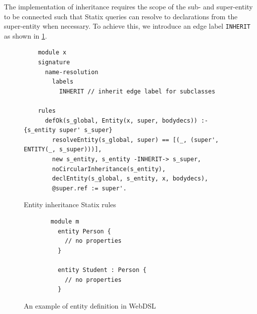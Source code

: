       The implementation of inheritance requires the scope of the sub- and super-entity to be connected such that Statix queries can resolve to declarations from the super-entity when necessary. To achieve this, we introduce an edge label \texttt{INHERIT} as shown in \cref{fig:inheritance-statix-rules}.

      \begin{figure}
        \begin{verbatim}
    module x
    signature
      name-resolution
        labels
          INHERIT // inherit edge label for subclasses
  
    rules
      defOk(s_global, Entity(x, super, bodydecs)) :- {s_entity super' s_super}
        resolveEntity(s_global, super) == [(_, (super', ENTITY(_, s_super)))],
        new s_entity, s_entity -INHERIT-> s_super,
        noCircularInheritance(s_entity),
        declEntity(s_global, s_entity, x, bodydecs),
        @super.ref := super'.
        \end{verbatim}
        \caption{\label{fig:inheritance-statix-rules}Entity inheritance Statix rules}
      \end{figure}

      \begin{figure}
        \begin{subfigure}[b]{0.1\textwidth}
          \begin{verbatim}
  module m
    entity Person {
      // no properties
    }

    entity Student : Person {
      // no properties
    }

          \end{verbatim}
          \caption{\label{fig:webdsl-entity-inheritance-example-webdsl}}
        \end{subfigure}
        \begin{subfigure}[b]{0.9\textwidth}
          \centering
          \caption{\label{fig:webdsl-entity-inheritance-example-sg}}
        \end{subfigure}
        \caption{\label{fig:webdsl-entity-inheritance-example}An example of entity definition in WebDSL}
      \end{figure}

